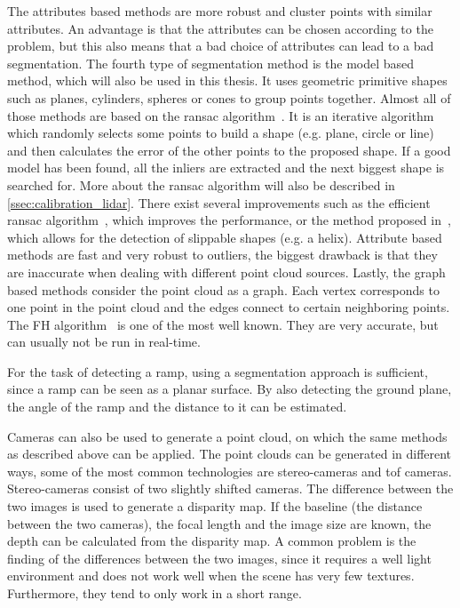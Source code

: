 The attributes based methods are more robust and cluster points with similar attributes.
An advantage is that the attributes can be chosen according to the problem, but this also means that a bad choice of attributes can lead to a bad segmentation.
The fourth type of segmentation method is the model based method, which will also be used in this thesis.
It uses geometric primitive shapes such as planes, cylinders, spheres or cones to group points together.
Almost all of those methods are based on the \gls{ransac} algorithm~\cite{Fischler1981}.
It is an iterative algorithm which randomly selects some points to build a shape (e.g. plane, circle or line) and then calculates the error of the other points to the proposed shape.
If a good model has been found, all the inliers are extracted and the next biggest shape is searched for.
More about the \gls{ransac} algorithm will also be described in \cref{ssec:calibration_lidar}.
There exist several improvements such as the efficient \gls{ransac} algorithm~\cite{Schnabel2007}, which improves the performance, or the method proposed in~\cite{li2011}, which allows for the detection of slippable shapes (e.g. a helix).
Attribute based methods are fast and very robust to outliers, the biggest drawback is that they are inaccurate when dealing with different point cloud sources.
Lastly, the graph based methods consider the point cloud as a graph.
Each vertex corresponds to one point in the point cloud and the edges connect to certain neighboring points.
The FH algorithm~\cite{Felzenszwalb2004} is one of the most well known.
They are very accurate, but can usually not be run in real-time.

For the task of detecting a ramp, using a segmentation approach is sufficient, since a ramp can be seen as a planar surface.
By also detecting the ground plane, the angle of the ramp and the distance to it can be estimated.

Cameras can also be used to generate a point cloud, on which the same methods as described above can be applied.
The point clouds can be generated in different ways, some of the most common technologies are stereo-cameras and \gls{tof} cameras.
Stereo-cameras consist of two slightly shifted cameras.
The difference between the two images is used to generate a disparity map.
If the baseline (the distance between the two cameras), the focal length and the image size are known, the depth can be calculated from the disparity map.
A common problem is the finding of the differences between the two images, since it requires a well light environment and does not work well when the scene has very few textures.
Furthermore, they tend to only work in a short range.

